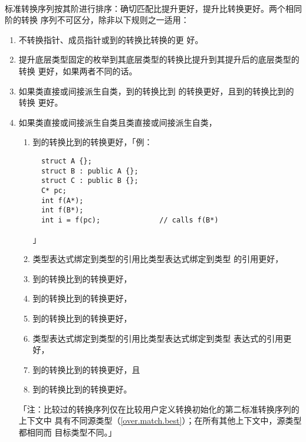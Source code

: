 \paragraph{}
标准转换序列按其阶进行排序：确切匹配比提升更好，提升比转换更好。两个相同阶的转换
序列不可区分，除非以下规则之一适用：
\begin{enumerate}
  \item{不转换指针、成员指针或到的转换比转换的更
    好。}
  \item{提升底层类型固定的枚举到其底层类型的转换比提升到其提升后的底层类型的转换
    更好，如果两者不同的话。}
  \item{如果类直接或间接派生自类，到的转换比到
    的转换更好，且到的转换比到的转换
    更好。}
  \item{如果类直接或间接派生自类且类直接或间接派生自类，
    \begin{enumerate}
      \item{到的转换比到的转换更好，「例：
\begin{lstlisting}
  struct A {};
  struct B : public A {};
  struct C : public B {};
  C* pc;
  int f(A*);
  int f(B*);
  int i = f(pc);              // calls f(B*)
\end{lstlisting}」}
      \item{类型表达式绑定到类型的引用比类型表达式绑定到类型
        的引用更好，}
      \item{到的转换比到的转换更好，}
      \item{到的转换比到的转换更好，}
      \item{到的转换比到的转换更好，}
      \item{类型表达式绑定到类型的引用比类型表达式绑定到类型
        表达式的引用更好，}
      \item{到的转换比到的转换更好，且}
      \item{到的转换比到的转换更好。}
    \end{enumerate}
    「注：比较过的转换序列仅在比较用户定义转换初始化的第二标准转换序列的上下文中
    具有不同源类型（\ref{over.match.best}）；在所有其他上下文中，源类型都相同而
    目标类型不同。」}
\end{enumerate}

